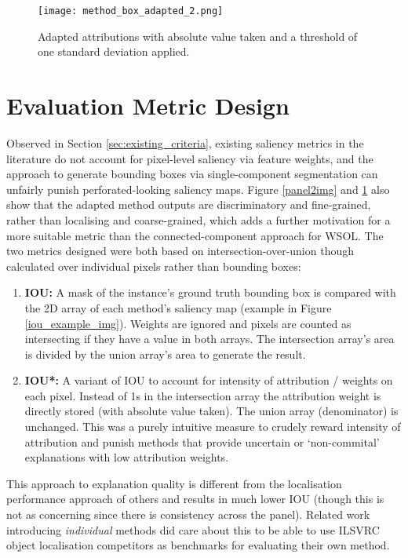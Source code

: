 \documentclass[main]{subfiles}
\begin{document}
\begin{figure}[htbp]
\centering
\texttt{[image: method\_box\_adapted\_2.png]}
\caption{Adapted attributions with absolute value taken and a threshold of one standard deviation applied.}
\label{panel3img}
\end{figure}


\newpage


\section{Evaluation Metric Design} \label{sec:metric}

Observed in Section \ref{sec:existing_criteria}, existing saliency metrics in the literature do not account for pixel-level saliency via feature weights, and the approach to generate bounding boxes via single-component segmentation can unfairly punish perforated-looking saliency maps. Figure \ref{panel2img} and \ref{panel3img} also show that the adapted method outputs are discriminatory and fine-grained, rather than localising and coarse-grained, which adds a further motivation for a more suitable metric than the connected-component approach for WSOL. The two metrics designed were both based on intersection-over-union though calculated over individual pixels rather than bounding boxes:

\begin{enumerate}
\item \textbf{IOU:} A mask of the instance's ground truth bounding box is compared with the 2D array of each method's saliency map (example in Figure \ref{iou_example_img}). Weights are ignored and pixels are counted as intersecting if they have a value in both arrays. The intersection array's area is divided by the union array's area to generate the result.

\item \textbf{IOU*:} A variant of IOU to account for intensity of attribution / weights on each pixel. Instead of 1s in the intersection array the attribution weight is directly stored (with absolute value taken). The union array (denominator) is unchanged. This was a purely intuitive measure to crudely reward intensity of attribution and punish methods that provide uncertain or `non-commital' explanations with low attribution weights.

\end{enumerate}

This approach to explanation quality is different from the localisation performance approach of others and results in much lower IOU (though this is not as concerning since there is consistency across the panel). Related work introducing \textit{individual} methods did care about this to be able to use ILSVRC object localisation competitors as benchmarks for evaluating their own method.
\end{document}
